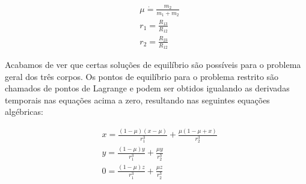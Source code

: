 \begin{equation}
\begin{aligned}
& \mu \dot{=} \frac{m_2}{m_1 + m_2} \\
& r_1 = \frac{R_{13}}{R_{12}} \\
& r_2 = \frac{R_{23}}{R_{12}}
\end{aligned}
\end{equation}

Acabamos de ver que certas soluções de equilíbrio são possíveis para o problema geral dos três corpos. Os pontos de equilíbrio para o problema restrito são chamados de pontos de Lagrange e podem ser obtidos igualando as derivadas temporais nas equações acima a zero, resultando nas seguintes equações algébricas:

\begin{equation}
\begin{aligned}
& x = \frac{(1 - \mu)(x - \mu)}{r_1^3} + \frac{\mu(1 - \mu + x)}{r_2^3} \\
& y = \frac{(1 - \mu)y}{r_1^3} + \frac{\mu y}{r_2^3} \\
& 0 = \frac{(1 - \mu)z}{r_1^3} + \frac{\mu z}{r_2^3}
\end{aligned}
\end{equation}